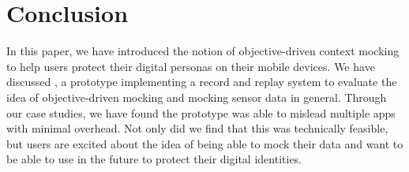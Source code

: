 \section{Conclusion}
\label{sec-conclusion}

In this paper, we have introduced the notion of objective-driven context
mocking to help users protect their digital personas on their mobile devices.
We have discussed \PocketMocker{}, a prototype implementing a record and
replay system to evaluate the idea of objective-driven mocking and mocking
sensor data in general. Through our case studies, we have found the prototype
was able to mislead multiple apps with minimal overhead. Not only did
we find that this was technically feasible, but users are excited about the
idea of being able to mock their data and want to be able to use
\PocketMocker{} in the future to protect their digital identities.

\newpage
